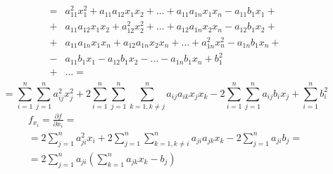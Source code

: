 \documentclass{article}
\begin{document}
\begin{align*}
    = & a_{11}^2 x_1^2 + a_{11}a_{12} x_{1}x_2 + \ldots + a_{11}a_{1n} x_1x_n - 
    a_{11}b_1x_1 +  \\
    + & a_{11}a_{12} x_1x_2 + a_{12}^2 x_2^2 + \ldots + a_{12}a_{1n} x_2x_n - 
    a_{12}b_1x_2 + \\
    + & a_{11}a_{1n} x_1x_n + a_{12}a_{1n} x_2x_n + \ldots + a_{1n}^2 x_n^2 - 
    a_{1n}b_1x_n + \\
    - & a_{11}b_1 x_1 - a_{12}b_1 x_2 - \ldots - a_{1n} b_1 x_n + 
    b_1^2  \\    
     + & \ldots = \\
\end{align*}
\[
    = \sum_{i = 1}^{n} \sum_{j=1}^{n}a_{ij}^2 x_j^2 + 2\sum_{i = 1}^{n} \sum_{j = 1}^{n} 
    \sum_{k=1, k \ne j}^{n} a_{ij}a_{ik} x_j x_k - 2 \sum_{i = 1}^{n} 
    \sum_{j = 1}^{n} a_{ij}b_i x_j + \sum_{i = 1}^{n} b_i^2
\]
\begin{gather*}
    f_{x_i} = \frac{\partial f}{\partial  x_i} = \\
    =2 \sum_{j=1}^{n} a_{ji}^2 x_i + 2 \sum_{j=1}^{n} 
    \sum_{k = 1, k \ne i}^{n}a_{ji}a_{jk} x_k
    - 2 \sum_{j=1}^{n} a_{ji} b_j =\\
    = 2 \sum_{j=1}^{n} a_{ji} \left( \sum_{k = 1}^{n} a_{jk} x_k - b_j \right)    
\end{gather*}
\end{document}
